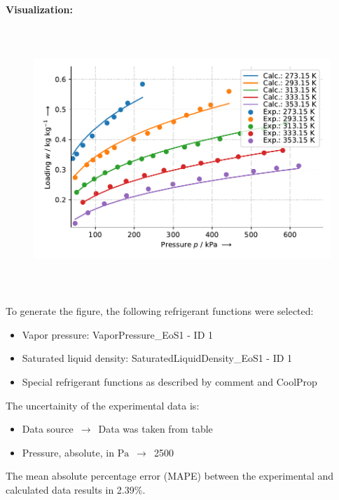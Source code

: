 \textbf{Visualization:}
%
\begin{figure}[!htp]
{\noindent\includegraphics[height=10cm, keepaspectratio]{figs/ads/ads_R-134a_activated_charcoal_powder_Fluka_DubininAstakhov_1.pdf}}
\end{figure}
%

To generate the figure, the following refrigerant functions were selected:
\begin{itemize}
\item Vapor pressure: VaporPressure\_EoS1 - ID 1
\item Saturated liquid density: SaturatedLiquidDensity\_EoS1 - ID 1
\item Special refrigerant functions as described by comment and CoolProp
\end{itemize}

The uncertainity of the experimental data is:
\begin{itemize}
\item Data source $\,\to\,$ Data was taken from table
\item Pressure, absolute, in $\si{\pascal}$ $\,\to\,$ 2500
\end{itemize}

The mean absolute percentage error (MAPE) between the experimental and calculated data results in 2.39\%.
\FloatBarrier
\newpage
